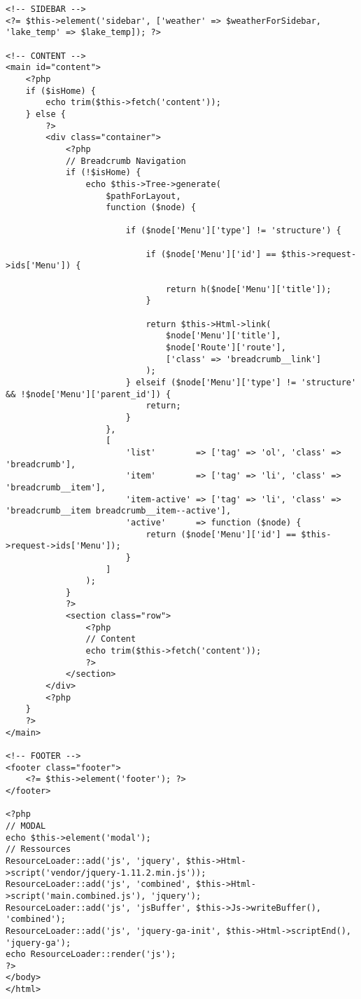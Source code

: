 \begin{lstlisting}[style=htmlcssjs, backgroundcolor = \color{lightgray},
caption=DOM der index.php]
<!-- SIDEBAR -->
<?= $this->element('sidebar', ['weather' => $weatherForSidebar, 'lake_temp' => $lake_temp]); ?>

<!-- CONTENT -->
<main id="content">
    <?php
    if ($isHome) {
        echo trim($this->fetch('content'));
    } else {
        ?>
        <div class="container">
            <?php
            // Breadcrumb Navigation
            if (!$isHome) {
                echo $this->Tree->generate(
                    $pathForLayout,
                    function ($node) {

                        if ($node['Menu']['type'] != 'structure') {

                            if ($node['Menu']['id'] == $this->request->ids['Menu']) {

                                return h($node['Menu']['title']);
                            }

                            return $this->Html->link(
                                $node['Menu']['title'],
                                $node['Route']['route'],
                                ['class' => 'breadcrumb__link']
                            );
                        } elseif ($node['Menu']['type'] != 'structure' && !$node['Menu']['parent_id']) {
                            return;
                        }
                    },
                    [
                        'list'        => ['tag' => 'ol', 'class' => 'breadcrumb'],
                        'item'        => ['tag' => 'li', 'class' => 'breadcrumb__item'],
                        'item-active' => ['tag' => 'li', 'class' => 'breadcrumb__item breadcrumb__item--active'],
                        'active'      => function ($node) {
                            return ($node['Menu']['id'] == $this->request->ids['Menu']);
                        }
                    ]
                );
            }
            ?>
            <section class="row">
                <?php
                // Content
                echo trim($this->fetch('content'));
                ?>
            </section>
        </div>
        <?php
    }
    ?>
</main>

<!-- FOOTER -->
<footer class="footer">
    <?= $this->element('footer'); ?>
</footer>

<?php
// MODAL
echo $this->element('modal');
// Ressources
ResourceLoader::add('js', 'jquery', $this->Html->script('vendor/jquery-1.11.2.min.js'));
ResourceLoader::add('js', 'combined', $this->Html->script('main.combined.js'), 'jquery');
ResourceLoader::add('js', 'jsBuffer', $this->Js->writeBuffer(), 'combined');
ResourceLoader::add('js', 'jquery-ga-init', $this->Html->scriptEnd(), 'jquery-ga');
echo ResourceLoader::render('js');
?>
</body>
</html>
\end{lstlisting}

\clearpage
